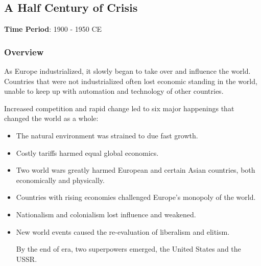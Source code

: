 \documentclass[11pt]{article}
\begin{document}
\subsection{A Half Century of Crisis}
\label{sec:org07f4741}

\textbf{Time Period}: 1900 - 1950 CE

\subsubsection{Overview}
\label{sec:org4b6c86a}

As Europe industrialized, it slowly began to take over and influence the world. Countries that were not industrialized often lost economic standing in the world, unable to keep up with automation and technology of other countries.

Increased competition and rapid change led to six major happenings that changed the world as a whole:

\begin{itemize}
\item The natural environment was strained to due fast growth.
\item Costly tariffs harmed equal global economics.
\item Two world wars greatly harmed European and certain Asian countries, both economically and physically.
\item Countries with rising economies challenged Europe's monopoly of the world.
\item Nationalism and colonialism lost influence and weakened.
\item New world events caused the re-evaluation of liberalism and elitism.

By the end of era, two superpowers emerged, the United States and the USSR.
\end{itemize}
\end{document}
